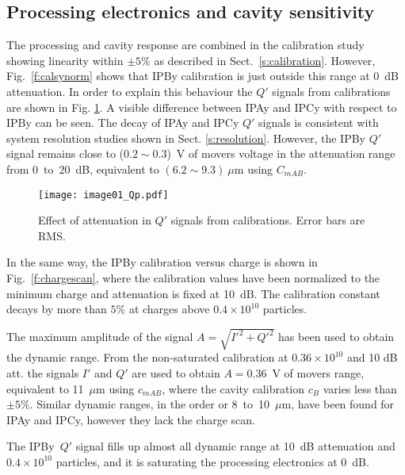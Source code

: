 \subsection{Processing electronics and cavity sensitivity}
The processing and cavity response are combined in the calibration study showing linearity within $\pm5\%$ as described in Sect.~\ref{s:calibration}. However, Fig.~\ref{f:calsynorm} shows that IPBy calibration is just outside this range at 0~dB attenuation. In order to explain this behaviour the $Q'$ signals from calibrations are shown in Fig. \ref{f:Qp}. A visible difference between IPAy and IPCy with respect to IPBy can be seen. The decay of IPAy and IPCy $Q'$ signals is consistent with system resolution studies shown in Sect. \ref{s:resolution}. However, the IPBy $Q'$ signal remains close to ($0.2\sim0.3$)~V of movers voltage in the attenuation range from 0~to~20~dB, equivalent to $(6.2\sim9.3)~\mu$m using $C_{mAB}$.\par%
\begin{figure}[!htb]
\centering
 \texttt{[image: image01\_Qp.pdf]}\caption{Effect of attenuation in $Q'$ signals from calibrations. Error bars are RMS.}\label{f:Qp}
\end{figure}
In the same way, the IPBy calibration versus charge is shown in Fig.~\ref{f:chargescan}, where the calibration values have been normalized to the minimum charge and attenuation is fixed at 10~dB. The calibration constant decays by more than $5\%$ at charges above $0.4\times10^{10}$ particles.\par
The maximum amplitude of the signal $A=\sqrt{I'^2+Q'^2}$ has been used to obtain the dynamic range. From the non-saturated calibration at $0.36\times10^{10}$ and 10 dB att. the signals $I'$ and $Q'$ are used to obtain $A=0.36$~V of movers range, equivalent to 11~$\mu$m using $c_{mAB}$, where the cavity calibration $c_B$ varies less than $\pm5\%$.  Similar dynamic ranges, in the order or 8~to~10~$\mu$m, have been found for IPAy and IPCy, however they lack the charge scan.\par
The IPBy~$Q'$ signal fills up almost all dynamic range at 10~dB attenuation and $0.4\times10^{10}$ particles, and it is saturating the processing electronics at 0~dB.\par
